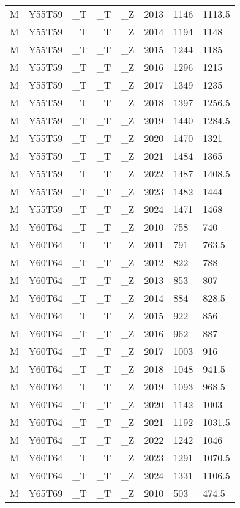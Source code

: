 \begin{longtable}[t]{llllllll}
M & Y55T59 & \_T & \_T & \_Z & 2013 & 1146 & 1113.5\\
M & Y55T59 & \_T & \_T & \_Z & 2014 & 1194 & 1148\\
\addlinespace
M & Y55T59 & \_T & \_T & \_Z & 2015 & 1244 & 1185\\
M & Y55T59 & \_T & \_T & \_Z & 2016 & 1296 & 1215\\
M & Y55T59 & \_T & \_T & \_Z & 2017 & 1349 & 1235\\
M & Y55T59 & \_T & \_T & \_Z & 2018 & 1397 & 1256.5\\
M & Y55T59 & \_T & \_T & \_Z & 2019 & 1440 & 1284.5\\
\addlinespace
M & Y55T59 & \_T & \_T & \_Z & 2020 & 1470 & 1321\\
M & Y55T59 & \_T & \_T & \_Z & 2021 & 1484 & 1365\\
M & Y55T59 & \_T & \_T & \_Z & 2022 & 1487 & 1408.5\\
M & Y55T59 & \_T & \_T & \_Z & 2023 & 1482 & 1444\\
M & Y55T59 & \_T & \_T & \_Z & 2024 & 1471 & 1468\\
\addlinespace
M & Y60T64 & \_T & \_T & \_Z & 2010 & 758 & 740\\
M & Y60T64 & \_T & \_T & \_Z & 2011 & 791 & 763.5\\
M & Y60T64 & \_T & \_T & \_Z & 2012 & 822 & 788\\
M & Y60T64 & \_T & \_T & \_Z & 2013 & 853 & 807\\
M & Y60T64 & \_T & \_T & \_Z & 2014 & 884 & 828.5\\
\addlinespace
M & Y60T64 & \_T & \_T & \_Z & 2015 & 922 & 856\\
M & Y60T64 & \_T & \_T & \_Z & 2016 & 962 & 887\\
M & Y60T64 & \_T & \_T & \_Z & 2017 & 1003 & 916\\
M & Y60T64 & \_T & \_T & \_Z & 2018 & 1048 & 941.5\\
M & Y60T64 & \_T & \_T & \_Z & 2019 & 1093 & 968.5\\
\addlinespace
M & Y60T64 & \_T & \_T & \_Z & 2020 & 1142 & 1003\\
M & Y60T64 & \_T & \_T & \_Z & 2021 & 1192 & 1031.5\\
M & Y60T64 & \_T & \_T & \_Z & 2022 & 1242 & 1046\\
M & Y60T64 & \_T & \_T & \_Z & 2023 & 1291 & 1070.5\\
M & Y60T64 & \_T & \_T & \_Z & 2024 & 1331 & 1106.5\\
\addlinespace
M & Y65T69 & \_T & \_T & \_Z & 2010 & 503 & 474.5\\

\end{longtable}
